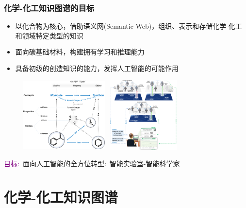 \begin{frame}[allowframebreaks]
	\frametitle{化学-化工知识图谱的目标}
	\begin{itemize}
		\item 以化合物为核心，借助语义网\textrm{(Semantic Web)}，组织、表示和存储化学-化工和领域特定类型的知识
	\item 面向碳基础材料，构建拥有学习和推理能力
		\item 具备初级的创造知识的能力，发挥人工智能的可能作用%
\end{itemize}
\begin{figure}[h!]
\centering
\includegraphics[height=1.50in,width=1.75in,viewport=0 0 950 790,clip]{Figures/Mapping-the-relationship-between-molecule-and-synthon.png}
\hspace{5pt}
\includegraphics[height=1.50in,width=1.55in,viewport=0 0 750 790,clip]{Figures/TWA-KG-Marie.png}
\label{Fig:Mapping-relationship-molecule-synthon-2}
\end{figure}
\textcolor{purple}{目标:}~面向人工智能的全方位转型:~智能实验室-智能科学家
\end{frame}

\section{化学-化工知识图谱}
